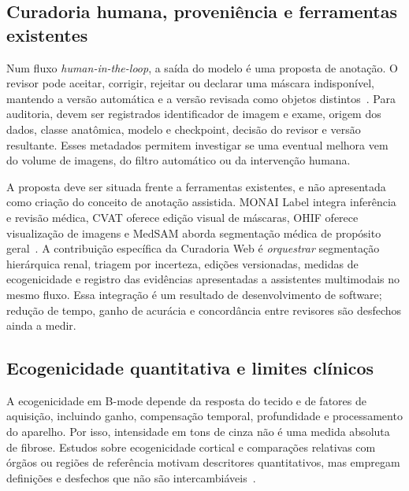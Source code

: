 \documentclass[12pt]{article}
\begin{document}
\subsection{Curadoria humana, proveniência e ferramentas existentes}
Num fluxo \textit{human-in-the-loop}, a saída do modelo é uma proposta de anotação. O revisor pode aceitar, corrigir, rejeitar ou declarar uma máscara indisponível, mantendo a versão automática e a versão revisada como objetos distintos~\cite{Budd2021HITL}. Para auditoria, devem ser registrados identificador de imagem e exame, origem dos dados, classe anatômica, modelo e checkpoint, decisão do revisor e versão resultante. Esses metadados permitem investigar se uma eventual melhora vem do volume de imagens, do filtro automático ou da intervenção humana.

A proposta deve ser situada frente a ferramentas existentes, e não apresentada como criação do conceito de anotação assistida. MONAI Label integra inferência e revisão médica, CVAT oferece edição visual de máscaras, OHIF oferece visualização de imagens e MedSAM aborda segmentação médica de propósito geral~\cite{DiazPinto2024MONAILabel,Aljabri2022AnnotationSurvey,CVATDocumentation,OHIFDocumentation,Ma2024MedSAM}. A contribuição específica da Curadoria Web é \emph{orquestrar} segmentação hierárquica renal, triagem por incerteza, edições versionadas, medidas de ecogenicidade e registro das evidências apresentadas a assistentes multimodais no mesmo fluxo. Essa integração é um resultado de desenvolvimento de software; redução de tempo, ganho de acurácia e concordância entre revisores são desfechos ainda a medir.

\subsection{Ecogenicidade quantitativa e limites clínicos}
A ecogenicidade em B-mode depende da resposta do tecido e de fatores de aquisição, incluindo ganho, compensação temporal, profundidade e processamento do aparelho. Por isso, intensidade em tons de cinza não é uma medida absoluta de fibrose. Estudos sobre ecogenicidade cortical e comparações relativas com órgãos ou regiões de referência motivam descritores quantitativos, mas empregam definições e desfechos que não são intercambiáveis~\cite{Manley2001,Moghazi2005,Beutler2024SRI,Zhao2025Echogenicity}.
\end{document}

